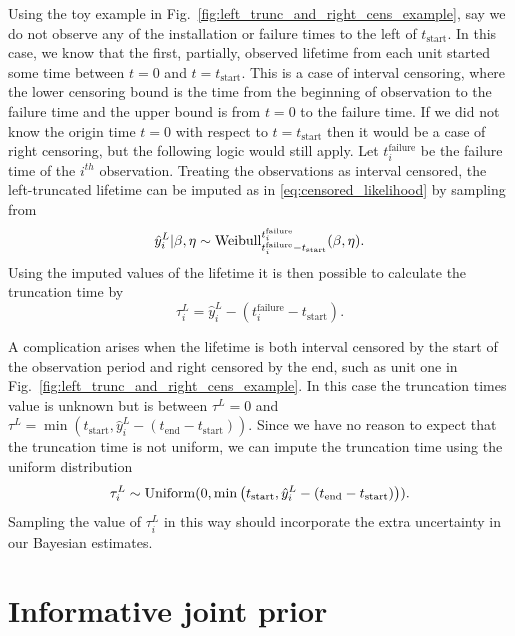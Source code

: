 Using the toy example in Fig.~\ref{fig:left_trunc_and_right_cens_example}, say we do not observe any of the installation or failure times to the left of $t_\text{start}$. In this case, we know that the first, partially, observed lifetime from each unit started some time between $t = 0$ and $t = t_\text{start}$. This is a case of interval censoring, where the lower censoring bound is the time from the beginning of observation to the failure time and the upper bound is from $t = 0$ to the failure time. If we did not know the origin time $t = 0$ with respect to $t = t_\text{start}$ then it would be a case of right censoring, but the following logic would still apply. Let $t^{\text{failure}}_{i}$ be the failure time of the $i^{th}$ observation. Treating the observations as interval censored, the left-truncated lifetime can be imputed as in \eqref{eq:censored_likelihood} by sampling from
\begin{equation}
    \hat{y}^L_i|\beta, \eta \sim \hbox{Weibull}^{t^{\text{failure}}_{i}}_{t^{\text{failure}}_{i} - t_\text{start}}(\beta, \eta).
\end{equation}
Using the imputed values of the lifetime it is then possible to calculate the truncation time by
\begin{equation}
    \tau^L_i = \hat{y}^L_i - \left(t^{\text{failure}}_{i} - t_\text{start}\right).
\end{equation}

A complication arises when the lifetime is both interval censored by the start of the observation period and right censored by the end, such as unit one in Fig.~\ref{fig:left_trunc_and_right_cens_example}. In this case the truncation times value is unknown but is between $\tau^L = 0$ and $\tau^L = \min\left(t_\text{start}, \hat{y}^L_i - (t_\text{end} - t_\text{start})\right)$. Since we have no reason to expect that the truncation time is not uniform, we can impute the truncation time using the uniform distribution
\begin{equation}
    \label{eq:imp-trun-times}
    \tau^L_i \sim \hbox{Uniform}(0, \min\left(t_\text{start}, \hat{y}^L_i - (t_\text{end} - t_\text{start})\right)).
\end{equation}
Sampling the value of $\tau^L_i$ in this way should incorporate the extra uncertainty in our Bayesian estimates.

\section{Informative joint prior} \label{sec:weibull-joint-prior}

